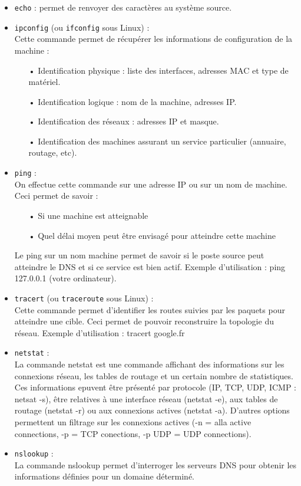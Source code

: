 \documentclass[a4paper]{article}
\begin{document}
	\begin{itemize}
	\item \texttt{echo} : permet de renvoyer des caractères au système source.\\
		
	\item \texttt{ipconfig} (ou \texttt{ifconfig} sous Linux) : \\
	Cette commande permet de récupérer les informations de configuration de la machine : \\
		\begin{itemize}
		\item[•]Identification physique : liste des interfaces, adresses MAC et type de matériel.
		\item[•]Identification logique : nom de la machine, adresses IP.
		\item[•]Identification des réseaux : adresses IP et masque.
		\item[•]Identification des machines assurant un service particulier (annuaire, routage, etc).
		\end{itemize}
		
	\item \texttt{ping} : \\
	On effectue cette commande sur une adresse IP ou sur un nom de machine. Ceci permet de savoir : 
		\begin{itemize}	
		\item[•]Si une machine est atteignable
		\item[•]Quel délai moyen peut être envisagé pour atteindre cette machine
		\end{itemize}
	Le ping sur un nom machine permet de savoir si le poste source peut atteindre le DNS et si ce service est bien actif.
	Exemple d'utilisation : ping 127.0.0.1 (votre ordinateur).
	
	\item \texttt{tracert} (ou \texttt{traceroute} sous Linux) : \\
	Cette commande permet d'identifier les routes suivies par les paquets pour atteindre une cible. Ceci permet de pouvoir reconstruire la topologie du réseau.
	Exemple d'utilisation : tracert google.fr
	
	\item \texttt{netstat} :\\
	La commande netstat est une commande affichant des informations sur les connexions réseau, les tables de routage et un certain nombre de statistiques. 
	Ces informations epuvent être présenté par  protocole (IP, TCP, UDP, ICMP : netsat -s), être relatives à une interface réseau (netstat -e), aux tables de routage (netstat -r) 
	ou aux connexions actives (netstat -a). D'autres options permettent un filtrage sur les connexions actives (-n = alla active connections, -p = TCP conections, -p UDP = UDP connections).
	
	\item \texttt{nslookup} : \\
	La commande nslookup permet d'interroger les serveurs DNS pour obtenir les informations définies pour un domaine déterminé.
	\end{itemize}
\end{document}
